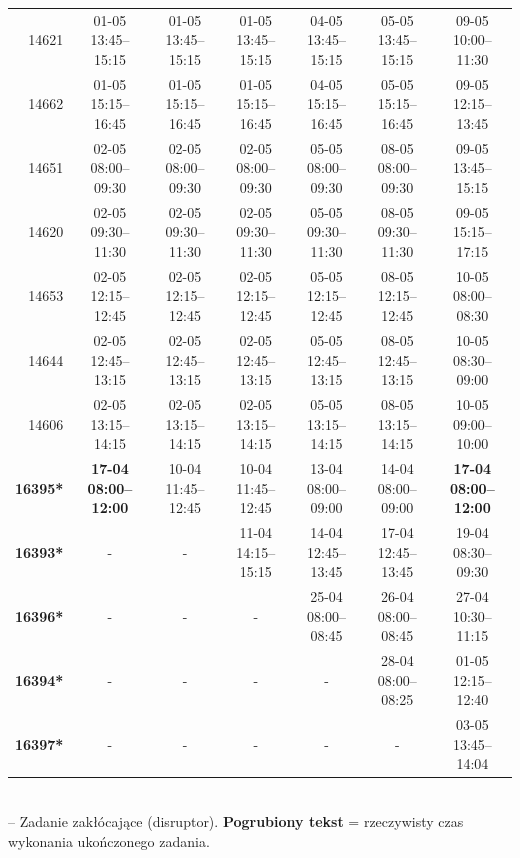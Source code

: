 \begin{table}[htbp]
\begin{tabular}{|r|c|c|c|c|c|c|}
14621 & 01-05 13:45--15:15 & 01-05 13:45--15:15 & 01-05 13:45--15:15 & 04-05 13:45--15:15 & 05-05 13:45--15:15 & 09-05 10:00--11:30 \\ 
14662 & 01-05 15:15--16:45 & 01-05 15:15--16:45 & 01-05 15:15--16:45 & 04-05 15:15--16:45 & 05-05 15:15--16:45 & 09-05 12:15--13:45 \\ 
14651 & 02-05 08:00--09:30 & 02-05 08:00--09:30 & 02-05 08:00--09:30 & 05-05 08:00--09:30 & 08-05 08:00--09:30 & 09-05 13:45--15:15 \\ 
14620 & 02-05 09:30--11:30 & 02-05 09:30--11:30 & 02-05 09:30--11:30 & 05-05 09:30--11:30 & 08-05 09:30--11:30 & 09-05 15:15--17:15 \\ 
14653 & 02-05 12:15--12:45 & 02-05 12:15--12:45 & 02-05 12:15--12:45 & 05-05 12:15--12:45 & 08-05 12:15--12:45 & 10-05 08:00--08:30 \\ 
14644 & 02-05 12:45--13:15 & 02-05 12:45--13:15 & 02-05 12:45--13:15 & 05-05 12:45--13:15 & 08-05 12:45--13:15 & 10-05 08:30--09:00 \\ 
14606 & 02-05 13:15--14:15 & 02-05 13:15--14:15 & 02-05 13:15--14:15 & 05-05 13:15--14:15 & 08-05 13:15--14:15 & 10-05 09:00--10:00 \\ 
\hline
\textbf{16395*} & \textbf{17-04 08:00--12:00} & 10-04 11:45--12:45 & 10-04 11:45--12:45 & 13-04 08:00--09:00 & 14-04 08:00--09:00 & \textbf{17-04 08:00--12:00} \\ 
\textbf{16393*} & - & - & 11-04 14:15--15:15 & 14-04 12:45--13:45 & 17-04 12:45--13:45 & 19-04 08:30--09:30 \\ 
\textbf{16396*} & - & - & - & 25-04 08:00--08:45 & 26-04 08:00--08:45 & 27-04 10:30--11:15 \\ 
\textbf{16394*} & - & - & - & - & 28-04 08:00--08:25 & 01-05 12:15--12:40 \\ 
\textbf{16397*} & - & - & - & - & - & 03-05 13:45--14:04 \\ 
\hline
\end{tabular}
\\ {\tiny * -- Zadanie zakłócające (disruptor). \textbf{Pogrubiony tekst} = rzeczywisty czas wykonania ukończonego zadania.}
\end{table}

\vspace{0.8cm}

